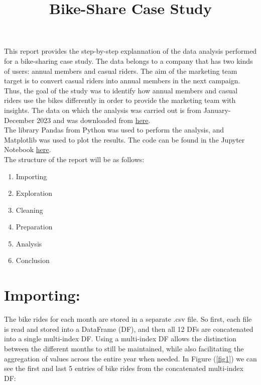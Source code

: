 \documentclass[12pt]{article}
\begin{document}
\title{Bike-Share Case Study}
\date{}
\maketitle

This report provides the step-by-step explannation of the data analysis performed for a bike-sharing case study. The data belongs to a company that has two kinds of users: annual members and casual riders. The aim of the marketing team target is to convert casual riders into annual members in the next campaign. Thus, the goal of the study was to identify how annual members and casual riders use the bikes differently in order to provide the marketing team with insights. The data on which the analysis was carried out is from January-December 2023 and was downloaded from \href{https://divvy-tripdata.s3.amazonaws.com/index.html}{here}. \\

The library Pandas from Python was used to perform the analysis, and Matplotlib was used to plot the results. The code can be found in the Jupyter Notebook \href{https://github.com/SummerKassem/BikeShareCS/blob/main/PythonCode/bike_share_analysis.html}{here}. \\

The structure of the report will be as follows:
\begin{enumerate}
	\item Importing
	\item Exploration
	\item Cleaning
	\item Preparation
	\item Analysis
	\item Conclusion
\end{enumerate}

\section{Importing:}

The bike rides for each month are stored in a separate .csv file. So first, each file is read and stored into a DataFrame (DF), and then all 12 DFs are concatenated into a single multi-index DF. Using a multi-index DF allows the distinction between the different months to still be maintained, while also facilitating the aggregation of values across the entire year when needed. In Figure (\ref{fig1}) we can see the first and last 5 entries of bike rides from the concatenated multi-index DF:
\end{document}
